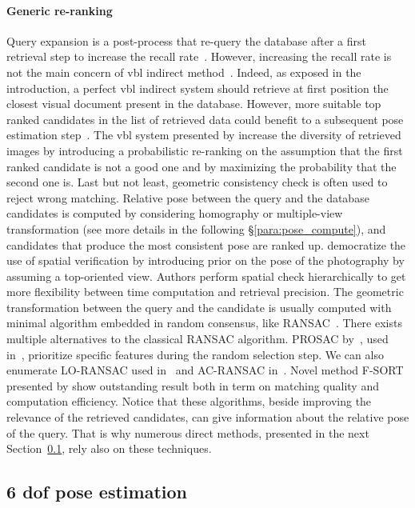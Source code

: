 \paragraph{Generic re-ranking}    
Query expansion is a post-process that re-query the database after a first retrieval step to increase the recall rate~\citep{Chum2007,Chum2011,Tolias2014}. However, increasing the recall rate is not the main concern of \ac{vbl} indirect method~\citep{Sattler2012}. Indeed, as exposed in the introduction, a perfect \ac{vbl} indirect system should retrieve at first position the closest visual document present in the database. However, more suitable top ranked candidates in the list of retrieved data could benefit to a subsequent pose estimation step~\citep{Song2016}. The \ac{vbl} system presented by \citet{Cao2013} increase the diversity of retrieved images by introducing a probabilistic re-ranking on the assumption that the first ranked candidate is not a good one and by maximizing the probability that the second one is.
\label{par:ransac}
Last but not least, geometric consistency check is often used to reject wrong matching. Relative pose between the query and the database candidates is computed by considering homography or multiple-view transformation (see more details in the following \S\ref{para:pose_compute}), and candidates that produce the most consistent pose are ranked up. \citet{Philbin2007} democratize the use of spatial verification by introducing prior on the pose of the photography by assuming a top-oriented view. Authors perform spatial check hierarchically to get more flexibility between time computation and retrieval precision. The geometric transformation between the query and the candidate is usually computed with minimal algorithm embedded in random consensus, like RANSAC~\citep{Fischler1981}. There exists multiple alternatives to the classical RANSAC algorithm. PROSAC by~\citep{Chum2005}, used in~\citep{Donoser2014}, prioritize specific features during the random selection step. We can also enumerate LO-RANSAC used in~\citep{Philbin2007} and AC-RANSAC in~\citep{Qu2015,Qu2016}. Novel method F-SORT presented by \citet{Chan2016} show outstanding result both in term on matching quality and computation efficiency. Notice that these algorithms, beside improving the relevance of the retrieved candidates, can give information about the relative pose of the query. That is why numerous direct methods, presented in the next Section~\ref{sec:fine_pose_estimation}, rely also on these techniques.

\subsection{6 \acs*{dof} pose estimation}
\label{sec:fine_pose_estimation}

